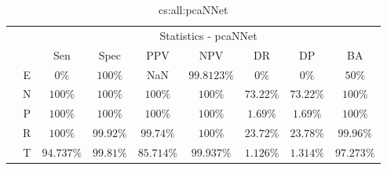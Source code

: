 \begin{table}[!ht]
	\centering
	\begin{tabular}{|c|c|c|c|c|c|c|c|c|}
		\cline{3-9}
		\multicolumn{2}{c|}{} & \multicolumn{7}{c|}{Statistics - pcaNNet} \\ \cline{3-9}
		\multicolumn{2}{c|}{} & Sen & Spec & PPV & NPV & DR & DP & BA \\ \hline
		\multirow{5}{*}{\rotatebox{90}{Class}} & E & $0\%$ & $100\%$ & NaN & $99.8123\%$ & $0\%$ & $0\%$ & $50\%$ \\ \cline{2-9}
		 & N & $100\%$ & $100\%$ & $100\%$ & $100\%$ & $73.22\%$ & $73.22\%$ & $100\%$ \\ \cline{2-9}
		 & P & $100\%$ & $100\%$ & $100\%$ & $100\%$ & $1.69\%$ & $1.69\%$ & $100\%$ \\ \cline{2-9}
		 & R & $100\%$ & $99.92\%$ & $99.74\%$ & $100\%$ & $23.72\%$ & $23.78\%$ & $99.96\%$ \\ \cline{2-9}
		 & T & $94.737\%$ & $99.81\%$ & $85.714\%$ & $99.937\%$ & $1.126\%$ & $1.314\%$ & $97.273\%$ \\ \hline
	\end{tabular}
	\caption{cs:all:pcaNNet}
	\label{tab:cs:all:pcaNNet}
\end{table}
